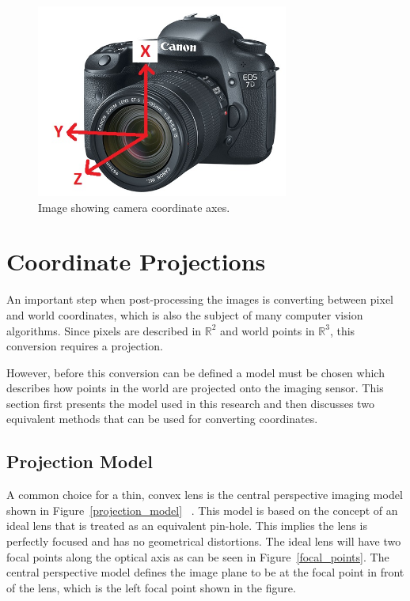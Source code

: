 \begin{figure}
	\centering
    \includegraphics[height=2.5in]{figures/camera_frame_canon.jpg}
    \caption[Camera coordinate frame]{Image showing camera coordinate axes.}
    \label{figure:camera_axes}
\end{figure}

\section{Coordinate Projections}
 
 An important step when post-processing the images is converting between pixel and world coordinates, which is also the subject of many computer vision algorithms.  Since pixels are described in $\mathbb{R}^2$ and world points in $\mathbb{R}^3$, this conversion requires a projection.  
 
 However, before this conversion can be defined a model must be chosen which describes how points in the world are projected onto the imaging sensor.  This section first presents the model used in this research and then discusses two equivalent methods that can be used for converting coordinates.  
 
 \subsection{Projection Model}
 
 A common choice for a thin, convex lens is the central perspective imaging model shown in Figure~\ref{projection_model} ~\citep{Coorke:2013}. This model is based on the concept of an ideal lens that is treated as an equivalent pin-hole.  This implies the lens is perfectly focused and has no geometrical distortions.  The ideal lens will have two focal points along the optical axis as can be seen in Figure~\ref{focal_points}.  The central perspective model defines the image plane to be at the focal point in front of the lens, which is the left focal point shown in the figure.  
 
